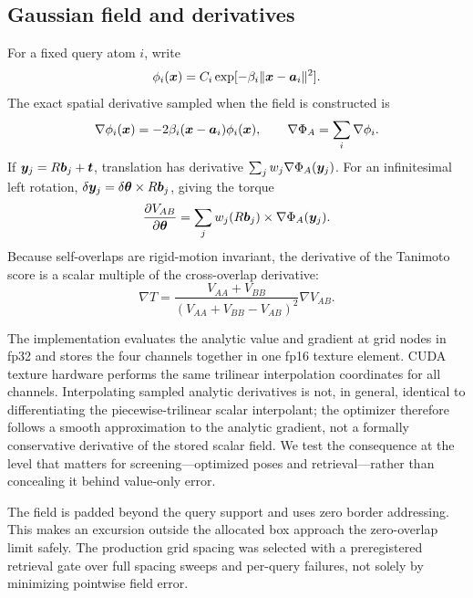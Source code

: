 \subsection{Gaussian field and derivatives}

For a fixed query atom $i$, write
\begin{equation}
 \phi_i(\bm{x})=C_i\exp[-\beta_i\|\bm{x}-\bm{a}_i\|^2].
\end{equation}
The exact spatial derivative sampled when the field is constructed is
\begin{equation}
 \nabla\phi_i(\bm{x})=-2\beta_i(\bm{x}-\bm{a}_i)\phi_i(\bm{x}),
 \qquad \nabla\Phi_A=\sum_i\nabla\phi_i.
\end{equation}
If $\bm{y}_j=R\bm{b}_j+\bm{t}$, translation has derivative
$\sum_jw_j\nabla\Phi_A(\bm{y}_j)$. For an infinitesimal left rotation,
$\delta\bm{y}_j=\delta\bm{\theta}\times R\bm{b}_j$, giving the torque
\begin{equation}
 \frac{\partial V_{AB}}{\partial\bm{\theta}}
 =\sum_j w_j(R\bm{b}_j)\times\nabla\Phi_A(\bm{y}_j).
\end{equation}
Because self-overlaps are rigid-motion invariant, the derivative of the
Tanimoto score is a scalar multiple of the cross-overlap derivative:
\begin{equation}
 \nabla T=\frac{V_{AA}+V_{BB}}
 {(V_{AA}+V_{BB}-V_{AB})^2}\nabla V_{AB}.
\end{equation}

The implementation evaluates the analytic value and gradient at grid nodes in
fp32 and stores the four channels together in one fp16 texture element. CUDA
texture hardware performs the same trilinear interpolation coordinates for all
channels. Interpolating sampled analytic derivatives is not, in general,
identical to differentiating the piecewise-trilinear scalar interpolant; the
optimizer therefore follows a smooth approximation to the analytic gradient,
not a formally conservative derivative of the stored scalar field. We test the
consequence at the level that matters for screening---optimized poses and
retrieval---rather than concealing it behind value-only error.

The field is padded beyond the query support and uses zero border addressing.
This makes an excursion outside the allocated box approach the zero-overlap
limit safely. The production grid spacing was selected with a preregistered
retrieval gate over full spacing sweeps and per-query failures, not solely by
minimizing pointwise field error.

